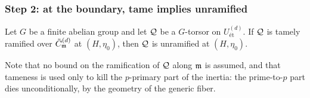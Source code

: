 \subsubsection*{Step 2: at the boundary, tame implies unramified}

\begin{prop}\label{prop:tame_implies_unramified_short}
    Let $G$ be a finite abelian group and let $\mathcal{Q}$ be a $G$-torsor on
    $U^{(d)}_{\text{\'et}}$. If $\mathcal{Q}$ is tamely ramified over $\tilde{C}_{\mathfrak{m}}^{(d)}$ at $(H, \eta_0)$,
    then $\mathcal{Q}$ is unramified at $(H, \eta_0)$.
\end{prop}

Note that no bound on the ramification of $\mathcal{Q}$ along $\mathfrak{m}$ is assumed, and that
tameness is used only to kill the $p$-primary part of the inertia: the prime-to-$p$ part
dies unconditionally, by the geometry of the generic fiber.

